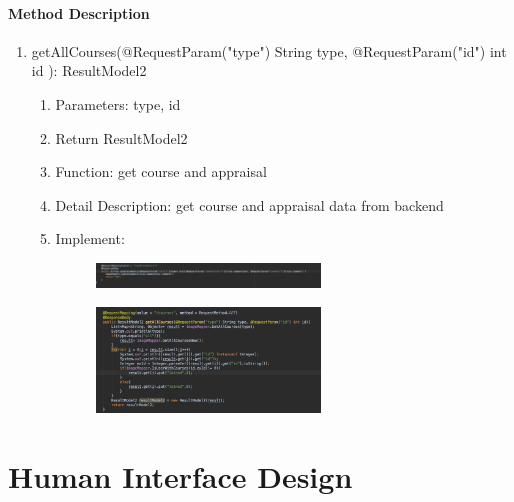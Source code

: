 \documentclass[16pt]{scrreprt}
\begin{document}
\subsubsection{Method Description}
\begin{enumerate}
    \item getAllCourses(@RequestParam("type") String type, @RequestParam("id") int id ): ResultModel2
        \begin{enumerate}
            \item Parameters: type, id
            \item Return ResultModel2
            \item Function: get course and appraisal
            \item Detail Description: get course and appraisal data from backend
            \item Implement:
                \begin{figure}[H]
                    \centering
                    \includegraphics[width=0.6\textwidth]{diagrams/appraisal-0.jpg}\\
                \end{figure}

                \begin{figure}[H]
                    \centering
                    \includegraphics[width=0.6\textwidth]{diagrams/appraisal-1.jpg}\\
                \end{figure}
        \end{enumerate}
\end{enumerate}



 


\chapter{Human Interface Design}
\end{document}
